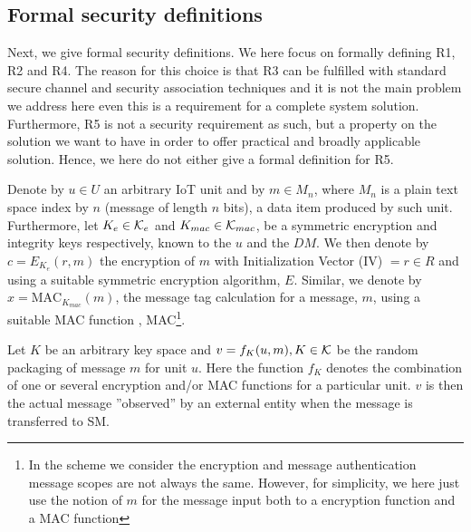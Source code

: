 {\subsection{Formal security definitions}
\label{requirements:secdefinitions}
Next, we give formal security definitions. We here focus on formally defining R1, R2 and R4. The reason for this choice  is that R3 can be fulfilled with standard secure channel and security association techniques and it is not the main problem we address here even this is a requirement for  a complete system solution. Furthermore, R5 is not a security requirement as such, but a property on the solution we want to have in order to offer practical and broadly applicable solution. Hence, we here do not either give a formal definition for R5.

Denote by $u\in U$ an arbitrary IoT unit and by $m \in M_n$, where $M_n$ is a plain text space index by $n$ (message of length $n$ bits), a data item produced by such unit. Furthermore, let $K_e \in {\cal{K}}_e$  and $K_{mac} \in {\cal{K}}_{mac}$, be a symmetric encryption and integrity keys respectively, known to the $u$ and the $DM$. We then denote by $c = E_{K_e}(r,m)$ the encryption of $m$ with Initialization Vector (IV) $= r \in R$ and using a suitable symmetric encryption algorithm, $E$. Similar, we denote by $x = \text{MAC}_{K_{mac}}(m)$, the message tag calculation for a message, $m$, using a suitable MAC function , MAC\footnote{In the scheme we consider the encryption and message authentication message scopes are not always the same. However, for simplicity, we here just use the notion of $m$ for the message input both to a encryption function and a MAC function}.

Let $K$ be an arbitrary key space and $v = f_K(u,m), K\in \cal{K}$ be the random packaging of message $m$ for unit $u$. Here the function $f_K$ denotes the combination of one or several encryption and/or MAC functions for a particular unit. $v$ is then the actual message ''observed'' by an external entity when the message is transferred to SM.

}

